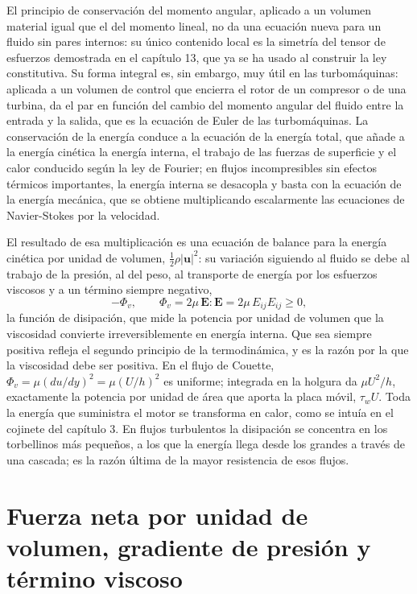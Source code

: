 \documentclass[10pt,openany]{book}
\begin{document}
El principio de conservación del momento angular, aplicado a un volumen material igual que el del momento lineal, no da una ecuación nueva para un fluido sin pares internos: su único contenido local es la simetría del tensor de esfuerzos demostrada en el capítulo 13, que ya se ha usado al construir la ley constitutiva. Su forma integral es, sin embargo, muy útil en las turbomáquinas: aplicada a un volumen de control que encierra el rotor de un compresor o de una turbina, da el par en función del cambio del momento angular del fluido entre la entrada y la salida, que es la ecuación de Euler de las turbomáquinas. La conservación de la energía conduce a la ecuación de la energía total, que añade a la energía cinética la energía interna, el trabajo de las fuerzas de superficie y el calor conducido según la ley de Fourier; en flujos incompresibles sin efectos térmicos importantes, la energía interna se desacopla y basta con la ecuación de la energía mecánica, que se obtiene multiplicando escalarmente las ecuaciones de Navier-Stokes por la velocidad.

El resultado de esa multiplicación es una ecuación de balance para la energía cinética por unidad de volumen, \(\tfrac12\rho|\mathbf{u}|^{2}\): su variación siguiendo al fluido se debe al trabajo de la presión, al del peso, al transporte de energía por los esfuerzos viscosos y a un término siempre negativo,
\begin{equation}
-\Phi_v, \qquad \Phi_v = 2\mu\,\mathbf{E}:\mathbf{E} = 2\mu\,E_{ij}E_{ij} \ge 0, \label{eq:c14-disipacion}
\end{equation}
la función de disipación, que mide la potencia por unidad de volumen que la viscosidad convierte irreversiblemente en energía interna. Que sea siempre positiva refleja el segundo principio de la termodinámica, y es la razón por la que la viscosidad debe ser positiva. En el flujo de Couette, \(\Phi_v = \mu(du/dy)^{2} = \mu(U/h)^{2}\) es uniforme; integrada en la holgura da \(\mu U^{2}/h\), exactamente la potencia por unidad de área que aporta la placa móvil, \(\tau_w U\). Toda la energía que suministra el motor se transforma en calor, como se intuía en el cojinete del capítulo 3. En flujos turbulentos la disipación se concentra en los torbellinos más pequeños, a los que la energía llega desde los grandes a través de una cascada; es la razón última de la mayor resistencia de esos flujos.

\section{Fuerza neta por unidad de volumen, gradiente de presión y término viscoso}
\end{document}
